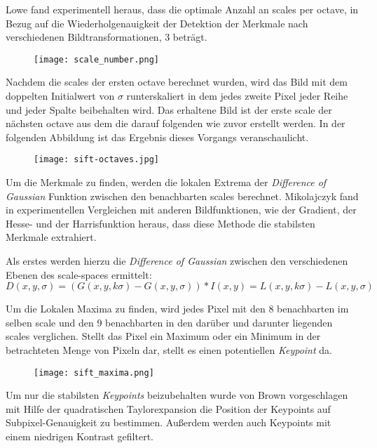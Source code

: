 Lowe fand experimentell heraus, dass die optimale Anzahl an \Glspl{scale} per \Gls{octave}, in Bezug auf die Wiederholgenauigkeit der Detektion der Merkmale nach verschiedenen Bildtransformationen, 3 beträgt.
\begin{figure}[h]
\texttt{[image: scale\_number.png]}
\centering
\end{figure}
Nachdem die \Glspl{scale} der ersten \Gls{octave} berechnet wurden, wird das Bild mit dem doppelten Initialwert von $ \sigma $ runterskaliert in dem jedes zweite Pixel jeder Reihe und jeder Spalte beibehalten wird. Das erhaltene Bild ist der erste \Gls{scale} der nächsten \Gls{octave} aus dem die darauf folgenden wie zuvor erstellt werden.
In der folgenden Abbildung ist das Ergebnis dieses Vorgangs veranschaulicht.

\begin{figure}[h]
\texttt{[image: sift-octaves.jpg]}
\centering
\end{figure}

Um die Merkmale zu finden, werden die lokalen Extrema der \emph{Difference of Gaussian} Funktion zwischen den benachbarten \Glspl{scale} berechnet. Mikolajczyk fand in experimentellen Vergleichen mit anderen Bildfunktionen, wie der Gradient, der Hesse- und der Harrisfunktion heraus, dass diese Methode die stabilsten Merkmale extrahiert.

Als erstes werden hierzu die \emph{Difference of Gaussian} zwischen den verschiedenen Ebenen des \Gls{scale-space}s ermittelt:	
\begin{equation}
D(x, y, \sigma) = (G(x, y, k\sigma) - G(x, y, \sigma)) \ast I(x, y)
= L(x, y, k\sigma) - L(x, y, \sigma)
\end{equation} 

Um die Lokalen Maxima zu finden, wird jedes Pixel mit den 8 benachbarten im selben \Gls{scale} und den 9 benachbarten in den darüber und darunter liegenden \Glspl{scale} verglichen. Stellt das Pixel ein Maximum oder ein Minimum in der betrachteten Menge von Pixeln dar, stellt es einen potentiellen \emph{Keypoint} da.

\begin{figure}[h]
\texttt{[image: sift\_maxima.png]}
\centering
\end{figure}

Um nur die stabilsten \emph{Keypoints} beizubehalten wurde von Brown vorgeschlagen mit Hilfe der quadratischen Taylorexpansion die Position der Keypoints auf Subpixel-Genauigkeit zu bestimmen.
Außerdem werden auch Keypoints mit einem niedrigen Kontrast gefiltert.

